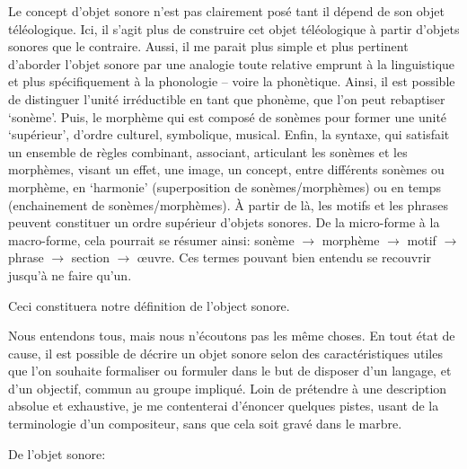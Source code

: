 \documentclass{article}
\begin{document}
Le concept d'objet sonore n'est pas clairement posé tant il dépend de son objet téléologique. Ici, il s'agit plus de construire cet objet téléologique à partir d'objets sonores que le contraire.   
Aussi, il me parait plus simple et plus pertinent d'aborder l'objet sonore par une analogie toute relative emprunt à la linguistique et plus spécifiquement à la phonologie -- voire la phonètique. Ainsi, il est possible de distinguer l'unité irréductible en tant que phonème, que l'on peut rebaptiser `sonème'. Puis, le morphème qui est composé de sonèmes pour former une unité `supérieur', d'ordre culturel, symbolique, musical. Enfin, la syntaxe, qui satisfait un ensemble de règles combinant, associant, articulant les sonèmes et les morphèmes, visant un effet, une image, un concept, entre différents sonèmes ou morphème, en `harmonie' (superposition de sonèmes/morphèmes) ou en temps (enchainement de sonèmes/morphèmes). À partir de là, les motifs et les phrases peuvent constituer un ordre supérieur d'objets sonores. De la micro-forme à la macro-forme, cela pourrait se résumer ainsi:
sonème $\rightarrow$ morphème $\rightarrow$ motif $\rightarrow$ phrase $\rightarrow$ section $\rightarrow$ œuvre. Ces termes pouvant bien entendu se recouvrir jusqu'à ne faire qu'un.


Ceci constituera notre définition de l'object sonore.
\bigskip


{Nous entendons tous, mais nous n'écoutons pas les même choses.}
En tout état de cause, il est possible de décrire un objet sonore selon des caractéristiques utiles que l'on souhaite formaliser ou formuler dans le but de disposer d'un langage, et d'un objectif, commun au groupe impliqué. Loin de prétendre à une description absolue et exhaustive, je me contenterai d'énoncer quelques pistes, usant de la terminologie d'un compositeur, sans que cela soit gravé dans le marbre. 
\bigskip

De l'objet sonore:
\end{document}
